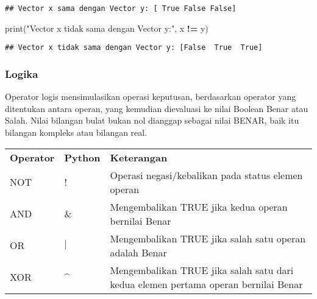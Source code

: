 \documentclass[
]{docs}
\newenvironment{Shaded}{\begin{snugshade}}{\end{snugshade}}
\newcommand{\BuiltInTok}[1]{#1}
\newcommand{\NormalTok}[1]{#1}
\newcommand{\OperatorTok}[1]{\textcolor[rgb]{0.81,0.36,0.00}{\textbf{#1}}}
\newcommand{\StringTok}[1]{\textcolor[rgb]{0.31,0.60,0.02}{#1}}
\begin{document}
\begin{verbatim}
## Vector x sama dengan Vector y: [ True False False]
\end{verbatim}

\begin{Shaded}
\begin{Highlighting}[]
\BuiltInTok{print}\NormalTok{(}\StringTok{"Vector x tidak sama dengan Vector y:"}\NormalTok{, x }\OperatorTok{!=}\NormalTok{ y) }
\end{Highlighting}
\end{Shaded}

\begin{verbatim}
## Vector x tidak sama dengan Vector y: [False  True  True]
\end{verbatim}

\hypertarget{logika}{%
\subsubsection{Logika}\label{logika}}

Operator logis mensimulasikan operasi keputusan, berdasarkan operator yang ditentukan antara operan, yang kemudian dievaluasi ke nilai Boolean Benar atau Salah. Nilai bilangan bulat bukan nol dianggap sebagai nilai BENAR, baik itu bilangan kompleks atau bilangan real.

\begin{longtable}[]{@{}
  >{\centering\arraybackslash}p{}
  >{\centering\arraybackslash}p{}
  >{\centering\arraybackslash}p{}@{}}
\toprule()
\endhead
\textbf{Operator} & \textbf{Python} & \textbf{Keterangan} \\
NOT & ! & Operasi negasi/kebalikan pada status elemen operan \\
AND & \& & Mengembalikan TRUE jika kedua operan bernilai Benar \\
OR & \(|\) & Mengembalikan TRUE jika salah satu operan adalah Benar \\
XOR & \^{} & Mengembalikan TRUE jika salah satu dari kedua elemen pertama operan bernilai Benar \\
\bottomrule()
\end{longtable}
\end{document}

